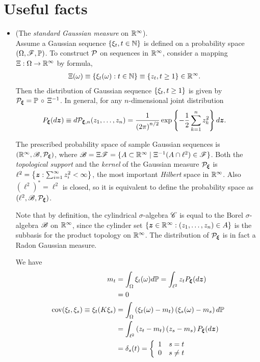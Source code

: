 \documentclass[11pt]{article}
\begin{document}
\newpage
\section{Useful facts}
\begin{itemize}
\item (The \emph{standard Gaussian measure} on ${\mathbb R}^{\infty}$). \citep{lifshits2013gaussian} \\
Assume a Gaussian sequence $\left\{\xi_{t}, t\in {\mathbb N}\right\}$ is defined on a probability space $(\Omega, {\mathscr F}, {\mathbb P})$. To construct ${\mathcal P}$ on sequences in ${\mathbb R}^{\infty}$, consider a mapping $\Xi: \Omega\rightarrow {\mathbb R}^{\infty}$ by formula,
\begin{align*}
\Xi(\omega) &\equiv \left\{\xi_{t}(\omega):  t\in {\mathbb N}\right\} \equiv \left\{z_{t}, t\ge 1\right\}\in {\mathbb R}^{\infty}.
\end{align*}  Then the distribution of Gaussian sequence $\left\{\xi_{t}, t\ge 1\right\}$ is given by ${\mathcal P}_{\boldsymbol{\xi}}= {\mathbb P}\,\circ\, \Xi^{-1}$. In general, for any $n$-dimensional joint distribution 
\begin{align*}
P_{\boldsymbol{\xi}}(d\boldsymbol{z})\equiv d{\mathcal P}_{\boldsymbol{\xi}, n}(z_{1}, \ldots, z_{n}) &= \frac{1}{\left(2\pi\right)^{n/2}}\exp\left\{-\frac{1}{2}\sum_{k=1}^{n}z_{k}^{2}\right\}d\boldsymbol{z}.
\end{align*} 


The prescribed probability space of sample Gaussian sequences is $({\mathbb R}^{\infty}, {\mathscr B}, {\mathcal P}_{\boldsymbol{\xi}})$, where ${\mathscr B} = \Xi{\mathscr F} = \{A\subset {\mathbb R}^{\infty}\;|\; \Xi^{-1}(A\cap \ell^{2})\in {\mathscr F} \}$.  Both the \emph{topological support} and the \emph{kernel} of the Gaussian measure ${\mathcal P}_{\boldsymbol{\xi}}$ is $\ell^{2}= \left\{\boldsymbol{z}: \sum_{i=1}^{\infty}z_{i}^{2}< \infty\right\}$, the most important \emph{Hilbert} space in ${\mathbb R}^{\infty}$.  Also $(\ell^{2})^{*}= \ell^{2}$ is closed, so it is equivalent to define the probability space as $(\ell^{2}, {\mathscr B}, {\mathcal P}_{\boldsymbol{\xi}})$.

Note that by definition, the cylindrical $\sigma$-algebra ${\mathscr C}$ is equal to the Borel $\sigma$-algebra ${\mathscr B}$ on ${\mathbb R}^{\infty}$, since the cylinder set $\left\{\boldsymbol{z}\in {\mathbb R}^{\infty}: (z_{1}, \ldots, z_{n})\in A \right\}$ is the subbasis for the product topology on ${\mathbb R}^{\infty}$. The distribution of ${\mathcal P}_{\boldsymbol{\xi}}$ is in fact a Radon Gaussian measure.

We have
\begin{align*}
m_{t} &= \int_{\Omega} \xi_{t}(\omega) d{\mathbb P}= \int_{\ell^{2}} z_{t} P_{\boldsymbol{\xi}}(d\boldsymbol{z})\\
& = 0\\
\text{cov}(\xi_{t}, \xi_{s}) \equiv \xi_{t}(K\xi_{s}) &= \int_{\Omega}\left(\xi_{t}(\omega)- m_{t}\right)\left(\xi_{s}(\omega)- m_{s}\right)d{\mathbb P}\\
&= \int_{\ell^{2}}\left(z_{t}- m_{t}\right)\left(z_{s}- m_{s}\right)P_{\boldsymbol{\xi}}(d\boldsymbol{z})\\
&= \delta_{s}(t) = \left\{\begin{array}{cc}
1 & s= t\\
0 & s\neq t 
\end{array} 
 \right.
\end{align*}


\end{itemize}
\end{document}
